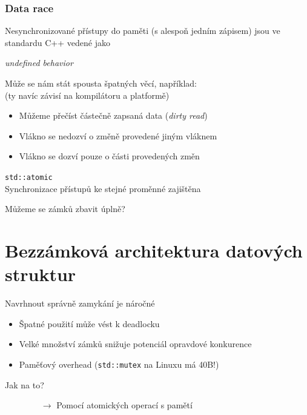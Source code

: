 \documentclass[usenames,dvipsnames,9pt]{beamer}
\begin{document}
\begin{frame}[fragile]
  \frametitle{Data race}

  Nesynchronizované přístupy do paměti (s alespoň jedním zápisem) jsou ve standardu C++ vedené jako
  \begin{center}
    \Large \faWarning \hspace{3pt} \emph{undefined behavior} \hspace{1pt} \faWarning
  \end{center}

  Může se nám stát spousta špatných věcí, například:\\
  (ty navíc závisí na kompilátoru a platformě)
  \begin{itemize}
    \item Můžeme přečíst částečně zapsaná data (\emph{dirty read})
    \item Vlákno se nedozví o změně provedené jiným vláknem
    \item Vlákno se dozví pouze o části provedených změn
  \end{itemize}

  \pause\vspace{2em}
  \begin{center}
    {\Large \texttt{std::atomic}} \\
    Synchronizace přístupů ke stejné proměnné zajištěna
  \end{center}
\end{frame}

\begin{frame}
  \begin{center}
    \Large Můžeme se zámků zbavit úplně?
  \end{center}
\end{frame}

\section{Bezzámková architektura datových struktur}

\begin{frame}

  Navrhnout správně zamykání je náročné

  \begin{itemize}
    \item Špatné použití může vést k deadlocku
    \item Velké množství zámků snižuje potenciál opravdové konkurence 
    \item Paměťový overhead (\texttt{std::mutex} na Linuxu má 40B!)
  \end{itemize}
  
  \pause
  \begin{center}
    \Large Jak na to?
  \end{center}

  \pause
 
  \begin{itemize}
  \item[\ \ \ \ \ $\rightarrow$] Pomocí atomických operací s pamětí
  \end{itemize}

\end{frame}
\end{document}
